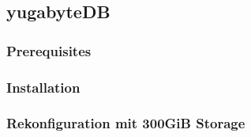 
\subsection{yugabyteDB}
%
\subsubsection{Prerequisites}

\subsubsection{Installation}

\subsubsection{Rekonfiguration mit 300GiB Storage}